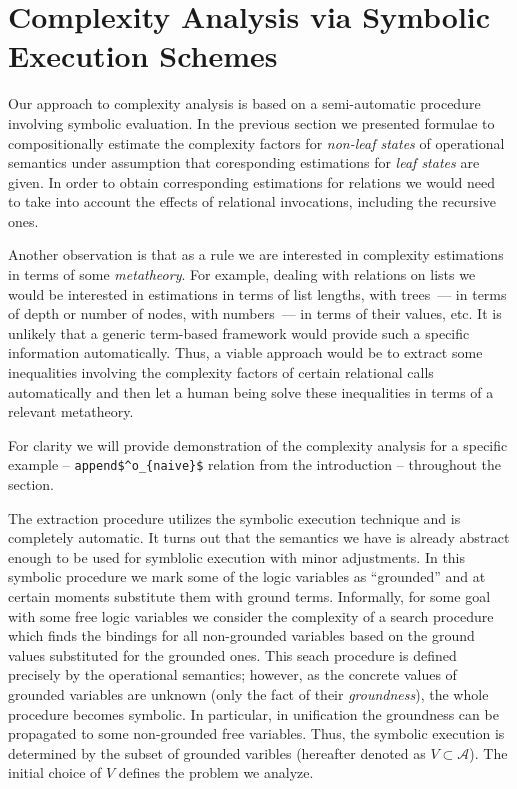 \section{Complexity Analysis via Symbolic Execution Schemes}
\label{sec:symbolic}

Our approach to complexity analysis is based on a semi-automatic procedure involving symbolic evaluation.
In the previous section we presented formulae to compositionally estimate the complexity factors for
\emph{non-leaf states} of operational semantics under assumption that coresponding estimations for
\emph{leaf states} are given. In order to obtain corresponding estimations for relations we
would need to take into account the effects of relational invocations, including the recursive ones.

Another observation is that as a rule we are interested in complexity estimations in terms of some \emph{metatheory}. For
example, dealing with relations on lists we would be interested in estimations in terms of list lengths,
with trees~--- in terms of depth or number of nodes, with numbers~--- in terms of their values, etc. It is
unlikely that a generic term-based framework would provide such a specific information automatically. Thus,
a viable approach would be to extract some inequalities involving the complexity factors of certain relational
calls automatically and then let a human being solve these inequalities in terms of a relevant metatheory.

For clarity we will provide demonstration of the complexity analysis for a specific example -- \lstinline|append$^o_{naive}$| relation from the introduction  -- throughout the section.

The extraction procedure utilizes the symbolic execution technique and is completely automatic.
It turns out that the semantics we have is already abstract enough to be used for symblolic
execution with minor adjustments.
In this symbolic procedure we mark some of the logic variables as ``grounded'' and at certain
moments substitute them with ground terms.
Informally, for some goal with some free logic variables we consider the complexity of a search
procedure which finds the bindings for all non-grounded variables based on the ground values
substituted for the grounded ones.
This seach procedure is defined precisely by the operational semantics; however, as the concrete
values of grounded variables are unknown (only the fact of their \emph{groundness}), the whole
procedure becomes symbolic.
In particular, in unification the groundness can be propagated to some non-grounded free variables.
Thus, the symbolic execution is determined by the subset of grounded varibles (hereafter denoted
as $V\subset\mathcal A$).
The initial choice of $V$ defines the problem we analyze.

